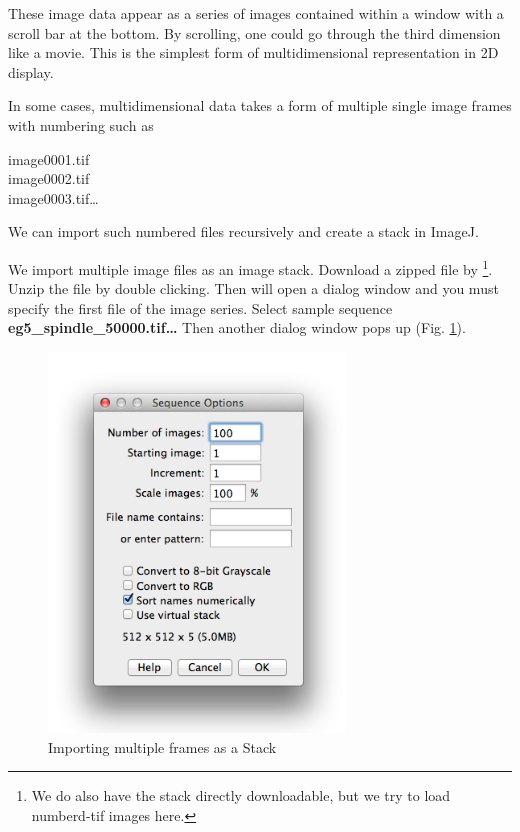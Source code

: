 These image data appear as a series of images contained within a window with a scroll bar at the bottom. By scrolling, one could go through the third dimension like a movie. This is the simplest form of multidimensional representation in 2D display. 

In some cases, multidimensional data takes a form of multiple
single image frames with numbering such as 


image0001.tif\\
image0002.tif\\
image0003.tif\dots

We can import such numbered files recursively and create a stack in ImageJ. 

\begin{indentexercise}{1}
We import multiple image files as an image stack. Download a zipped file by  \footnote{We do also have the stack directly downloadable, but we try to load numberd-tif images here.}. Unzip the file by double clicking. Then
 will open a dialog window and
you must specify the first file of the image series. Select sample sequence
\textbf{eg5\_spindle\_50000.tif\ldots} Then another dialog window pops up (Fig.
\ref{fig:img129}).

\begin{figure}[H]
\begin{center}
\includegraphics[width=0.7\textwidth]{fig/importSeriesDialog.png}
\caption{ Importing multiple frames as a Stack}
\label{fig:img129}
\end{center}
\end{figure}


\end{indentexercise}
